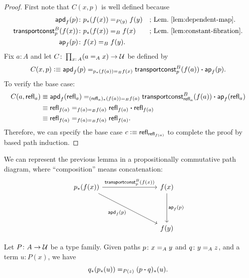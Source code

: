 \begin{proof}
    First note that $C(x,p)$ is well defined because
    \begin{align*}
        \fun{apd}_f(p)&\colon p_*(f(x))\eq{P(y)}f(y)
            &&\text{; Lem.~\ref{lem:dependent-map}.}\\
        \fun{transportconst}^B_p(f(x))&\colon p_*(f(x))\eq Bf(x)
            &&\text{; Lem.~\ref{lem:constant-fibration}.}\\
        \fun{ap}_f(p)&\colon f(x)\eq Bf(y).
    \end{align*}
    Fix\/ $a\colon A$ and let\/ $C\colon\prod_{x\colon A}(a\eq Ax)\to\univ$ be defined by
    \[
        C(x,p)\mathrel{\vcentcolon}\equiv\mathsf{apd}_f(p)\mathrel{=_{p_*(f(a))\mathrel{=_{B}}f(x)}}
            \mathsf{transportconst}^B_p(f(a))\mathbin{\boldsymbol{\cdot}}\mathsf{ap}_f(p).
    \]
    To verify the base case:
    \begin{align*}
        C(a,\mathsf{refl}_a)
            &\equiv\mathsf{apd}_f(\mathsf{refl}_a)
                \mathrel{=_{(\mathsf{refl}_a)_*(f(a))\mathrel{=_{B}}f(a)}}
                \mathsf{transportconst}^B_{\mathsf{refl}_a}(f(a))
                \mathbin{\boldsymbol{\cdot}}\mathsf{ap}_f(\mathsf{refl}_a)\\
            &\equiv\mathsf{refl}_{f(a)}
                \mathrel{=_{f(a)\mathrel{=_{B}}f(a)}}
                \mathsf{refl}_{f(a)}\mathbin{\boldsymbol{\cdot}}\mathsf{refl}_{f(a)}\\
            &\equiv \mathsf{refl}_{f(a)}
                \mathrel{=_{f(a)\mathrel{=_{B}}f(a)}}
                \mathsf{refl}_{f(a)}.
    \end{align*}
    Therefore, we can specify the base case\/ $c\mathrel{\vcentcolon}\equiv\mathsf{refl}_{\mathsf{refl}_{f(a)}}$ to complete the proof by based path induction.
    
\end{proof}

\begin{rem}
    We can represent the previous lemma in a propositionally commutative path diagram, where ``composition'' means concatenation:
    \[
        \begin{tikzcd}[column sep=2.8cm,row sep=1.5cm]
            p_*(f(x))
                    \arrow[r,"\fun{transportconst}^B_p(f(x))"]
                    \arrow[rd,"\fun{apd}_f(p)"']&f(x)
                    \arrow[d,"\fun{ap}_f(p)"]\\
                &f(y)
        \end{tikzcd}
    \]    
\end{rem}


\begin{lem}\label{lem:transport-composition}
    Let\/ $P\colon A\to\univ$ be a type family. Given paths\/ $p\colon x\eq Ay$ and\/ $q\colon y\eq Az$, and a term\/ $u\colon P(x)$, we have
    \[
        q_*(p_*(u))\mathrel{=_{P(z)}}(p\mathbin{\boldsymbol{\cdot}} q)_*(u).
    \]
\end{lem}

